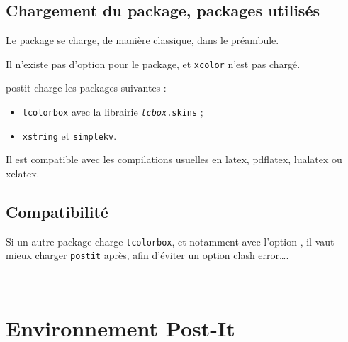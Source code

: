 \documentclass[french,a4paper,11pt]{article}
\newcommand\Cle[1]{{\bfseries\sffamily\textlangle #1\textrangle}}
\begin{document}
\subsection{Chargement du package, packages utilisés}

\begin{importantblock}
Le package se charge, de manière classique, dans le préambule.

Il n'existe pas d'option pour le package, et \texttt{xcolor} n'est pas chargé.
\end{importantblock}


\begin{noteblock}
\textsf{postit} charge les packages suivantes :

\begin{itemize}
	\item \texttt{tcolorbox} avec la librairie \texttt{\textit{tcbox}.skins} ;
	\item \texttt{xstring} et \texttt{simplekv}.
\end{itemize}

Il est compatible avec les compilations usuelles en \textsf{latex}, \textsf{pdflatex}, \textsf{lualatex} ou \textsf{xelatex}.
\end{noteblock}

\subsection{Compatibilité}

\begin{cautionblock}
Si un autre package charge \texttt{tcolorbox}, et notamment avec l'option \Cle{[most]}, il vaut mieux charger \texttt{postit} après, afin d'éviter un \textsf{option clash error\ldots}.
\end{cautionblock}


\vfill~

\pagebreak

\section{Environnement Post-It}
\end{document}
